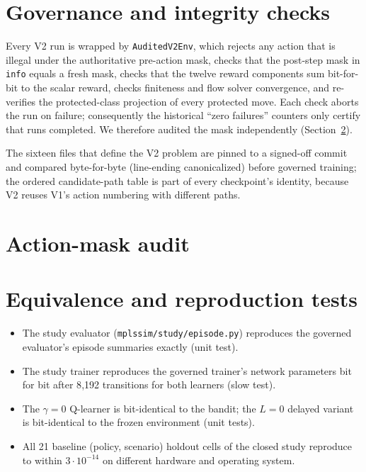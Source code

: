 \section{Governance and integrity checks}
Every V2 run is wrapped by \texttt{AuditedV2Env}, which rejects any action that
is illegal under the authoritative pre-action mask, checks that the post-step
mask in \texttt{info} equals a fresh mask, checks that the twelve reward
components sum bit-for-bit to the scalar reward, checks finiteness and flow
solver convergence, and re-verifies the protected-class projection of every
protected move. Each check aborts the run on failure; consequently the
historical ``zero failures'' counters only certify that runs completed. We
therefore audited the mask independently (Section~\ref{sec:maskaudit}).

The sixteen files that define the V2 problem are pinned to a signed-off commit
and compared byte-for-byte (line-ending canonicalized) before governed
training; the ordered candidate-path table is part of every checkpoint's
identity, because V2 reuses V1's action numbering with different paths.

\section{Action-mask audit}
\label{sec:maskaudit}


\section{Equivalence and reproduction tests}
\begin{itemize}
\item The study evaluator (\texttt{mplssim/study/episode.py}) reproduces the
governed evaluator's episode summaries exactly (unit test).
\item The study trainer reproduces the governed trainer's network parameters
bit for bit after 8{,}192 transitions for both learners (slow test).
\item The $\gamma=0$ Q-learner is bit-identical to the bandit; the $L=0$ delayed
variant is bit-identical to the frozen environment (unit tests).
\item All 21 baseline (policy, scenario) holdout cells of the closed study
reproduce to within $3\cdot10^{-14}$ on different hardware and operating system.
\end{itemize}
